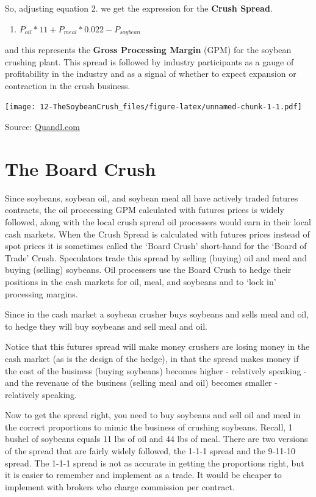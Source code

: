 \documentclass[
]{book}
\providecommand{\tightlist}{%
  \setlength{\itemsep}{0pt}\setlength{\parskip}{0pt}}
\begin{document}
So, adjusting equation 2. we get the expression for the \textbf{Crush Spread}.

\begin{enumerate}
\def\labelenumi{\arabic{enumi}.}
\setcounter{enumi}{2}
\tightlist
\item
  \(P_{oil}*11 + P_{meal}*0.022 - P_{soybean}\)
\end{enumerate}

and this represents the \textbf{Gross Processing Margin} (GPM) for the soybean crushing plant. This spread is followed by industry participants as a gauge of profitability in the industry and as a signal of whether to expect expansion or contraction in the crush business.

\texttt{[image: 12-TheSoybeanCrush\_files/figure-latex/unnamed-chunk-1-1.pdf]}

Source: \href{www.Quandl.com}{Quandl.com}

\hypertarget{the-board-crush}{%
\section{The Board Crush}\label{the-board-crush}}

Since soybeans, soybean oil, and soybean meal all have actively traded futures contracts, the oil proccessing GPM calculated with futures prices is widely followed, along with the local crush spread oil processers would earn in their local cash markets. When the Crush Spread is calculated with futures prices instead of spot prices it is sometimes called the `Board Crush' short-hand for the `Board of Trade' Crush. Speculators trade this spread by selling (buying) oil and meal and buying (selling) soybeans. Oil processers use the Board Crush to hedge their positions in the cash markets for oil, meal, and soybeans and to `lock in' processing margins.

Since in the cash market a soybean crusher buys soybeans and sells meal and oil, to hedge they will buy soybeans and sell meal and oil.

Notice that this futures spread will make money crushers are losing money in the cash market (as is the design of the hedge), in that the spread makes money if the cost of the business (buying soybeans) becomes higher - relatively speaking - and the revenaue of the business (selling meal and oil) becomes smaller - relatively speaking.

Now to get the spread right, you need to buy soybeans and sell oil and meal in the correct proportions to mimic the business of crushing soybeans. Recall, 1 bushel of soybeans equals 11 lbs of oil and 44 lbs of meal. There are two versions of the spread that are fairly widely followed, the 1-1-1 spread and the 9-11-10 spread. The 1-1-1 spread is not as accurate in getting the proportions right, but it is easier to remember and implement as a trade. It would be cheaper to implement with brokers who charge commission per contract.
\end{document}
